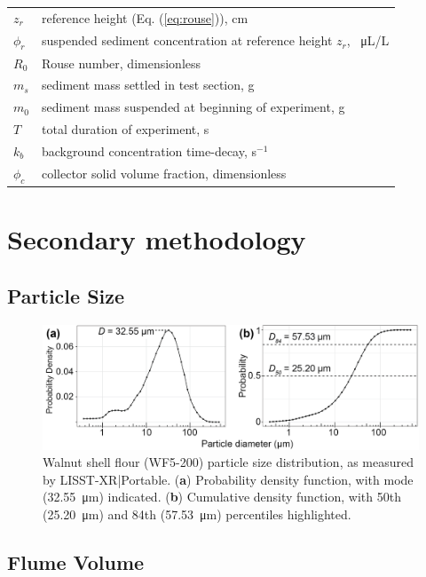 \documentclass[geosciences,article,submit,moreauthors,pdftex]{Definitions/mdpi}
\begin{document}
{\begin{tabular}{@{}ll}
 $z_r$ & reference height (Eq. (\ref{eq:rouse})), cm \\
 $\phi_r$ & suspended sediment concentration at reference height $z_r$, \SI{}{\micro\liter/\liter} \\
 $R_0$ & Rouse number, dimensionless \\
 $m_s$ & sediment mass settled in test section, g \\
 $m_0$ & sediment mass suspended at beginning of experiment, g \\
 $T$ & total duration of experiment, s \\
 $k_b$ & background concentration time-decay, s$^{-1}$ \\
 $\phi_c$ & collector solid volume fraction, dimensionless
 \end{tabular}}

\appendix
\section{Secondary methodology}
\unskip
\subsection{Particle Size}
\begin{figure}[H]
\centering
\includegraphics[width=5in]{../pics/wf5-200sizedist.png}
\caption{Walnut shell flour (WF5-200) particle size distribution, as measured by LISST-XR|Portable. (\textbf{a}) Probability density function, with mode (\SI{32.55}{\micro\metre}) indicated. (\textbf{b}) Cumulative density function, with 50th (\SI{25.20}{\micro\metre}) and 84th (\SI{57.53}{\micro\metre}) percentiles highlighted.}
\end{figure}

\subsection{Flume Volume}
\end{document}
